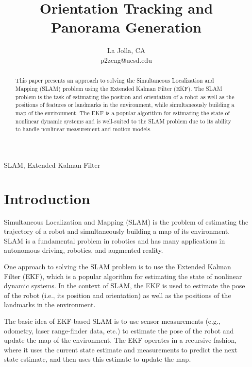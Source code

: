 \documentclass[conference]{IEEEtran}
\begin{document}
\title{Orientation Tracking and Panorama Generation\\

}

\author{
    La Jolla, CA \\
    p2zeng@ucsd.edu}


\maketitle

\begin{abstract}
    This paper presents an approach to solving the Simultaneous Localization and Mapping (SLAM) 
    problem using the Extended Kalman Filter (EKF). The SLAM problem is the task of estimating 
    the position and orientation of a robot as well as the positions of features or landmarks 
    in the environment, while simultaneously building a map of the environment. The EKF is a 
    popular algorithm for estimating the state of nonlinear dynamic systems and is well-suited
    to the SLAM problem due to its ability to handle nonlinear measurement and motion models.
\end{abstract}

\begin{IEEEkeywords}
    SLAM, Extended Kalman Filter
\end{IEEEkeywords}

\section{Introduction}

Simultaneous Localization and Mapping (SLAM) is the problem of estimating the trajectory of a robot and simultaneously building a map of its environment. SLAM is a fundamental problem in robotics and has many applications in autonomous driving, robotics, and augmented reality.

One approach to solving the SLAM problem is to use the Extended Kalman Filter (EKF), which is a popular algorithm for estimating the state of nonlinear dynamic systems. In the context of SLAM, the EKF is used to estimate the pose of the robot (i.e., its position and orientation) as well as the positions of the landmarks in the environment.

The basic idea of EKF-based SLAM is to use sensor measurements (e.g., odometry, laser range-finder data, etc.) to estimate the pose of the robot and update the map of the environment. The EKF operates in a recursive fashion, where it uses the current state estimate and measurements to predict the next state estimate, and then uses this estimate to update the map.
\end{document}
